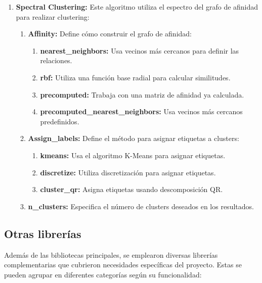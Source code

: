 \begin{enumerate}
    \item \textbf{Spectral Clustering:}
    Este algoritmo utiliza el espectro del grafo de afinidad para realizar clustering:
    \begin{enumerate}
        \item \textbf{Affinity:} Define cómo construir el grafo de afinidad:
        \begin{enumerate}
            \item \textbf{nearest\_neighbors:} Usa vecinos más cercanos para definir las relaciones.
            \item \textbf{rbf:} Utiliza una función base radial para calcular similitudes.
            \item \textbf{precomputed:} Trabaja con una matriz de afinidad ya calculada.
            \item \textbf{precomputed\_nearest\_neighbors:} Usa vecinos más cercanos predefinidos.
        \end{enumerate}
        \item \textbf{Assign\_labels:} Define el método para asignar etiquetas a clusters:
        \begin{enumerate}
            \item \textbf{kmeans:} Usa el algoritmo K-Means para asignar etiquetas.
            \item \textbf{discretize:} Utiliza discretización para asignar etiquetas.
            \item \textbf{cluster\_qr:} Asigna etiquetas usando descomposición QR.
        \end{enumerate}
        \item \textbf{n\_clusters:} Especifica el número de clusters deseados en los resultados.
    \end{enumerate}
\end{enumerate}

\subsection{Otras librerías}

Además de las bibliotecas principales, se emplearon diversas librerías complementarias que cubrieron necesidades específicas del proyecto. Estas se pueden agrupar en diferentes categorías según su funcionalidad:

